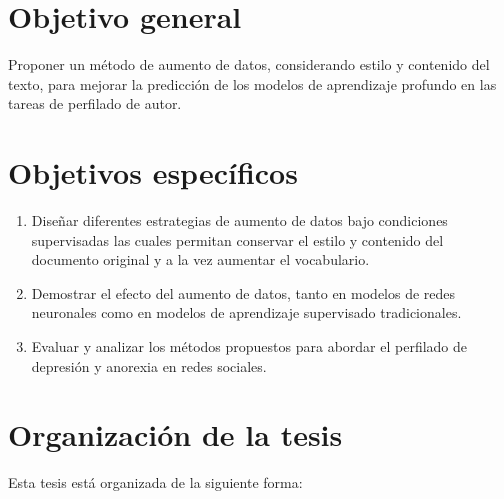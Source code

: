 \section{Objetivo general}

Proponer un método de aumento de datos, considerando estilo y contenido del texto, para mejorar la predicción de los modelos de aprendizaje profundo en las tareas de perfilado de autor.


\section{Objetivos específicos}
\begin{enumerate}
    \item Diseñar diferentes estrategias de aumento de datos bajo condiciones supervisadas las cuales permitan conservar el estilo y contenido del documento original y a la vez aumentar el vocabulario.
    \item Demostrar el efecto del aumento de datos, tanto en modelos de redes neuronales como en modelos de aprendizaje supervisado tradicionales.
    \item Evaluar y analizar los métodos propuestos para abordar el perfilado de depresión y anorexia en redes sociales.
 
\end{enumerate}

\section{Organización de la tesis}

Esta tesis está organizada de la siguiente forma: 


